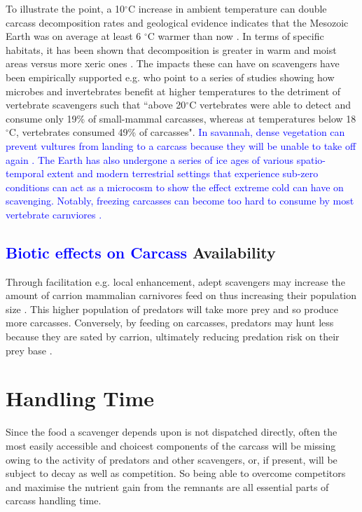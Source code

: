 \documentclass[a4paper,12pt]{article}
\begin{document}
To illustrate the point, a 10$^{\circ}$C increase in ambient temperature can double carcass decomposition rates \citep{parmenter2009carrion} and geological evidence indicates that the Mesozoic Earth was on average at least 6 $^{\circ}$C warmer than now \citep{sellwood2006mesozoic}.
In terms of specific habitats, it has been shown that decomposition is greater in warm and moist areas versus more xeric ones \citep{beasley2015vertebrates}.
The impacts these can have on scavengers have been empirically supported e.g. \cite{beasley2015vertebrates} who point to a series of studies showing how microbes and invertebrates benefit at higher temperatures to the detriment of vertebrate scavengers such that ``above 20$^{\circ}$C vertebrates were able to detect and consume only 19\% of small-mammal carcasses, whereas at temperatures below 18$^{\circ}$C, vertebrates consumed 49\% of carcasses".
\textcolor{blue}{In savannah, dense vegetation can prevent vultures from landing to a carcass because they will be unable to take off again \citep{bamford2009effect}. 
The Earth has also undergone a series of ice ages of various spatio-temporal extent \citep{diedrich2012cave} and modern terrestrial settings that experience sub-zero conditions can act as a microcosm to show the effect extreme cold can have on scavenging.
Notably, freezing carcasses can become too hard to consume by most vertebrate carnviores \citep{selva2003scavenging}.}

\subsection{\textcolor{blue}{Biotic effects on Carcass} Availability}
Through facilitation e.g. local enhancement, adept scavengers may increase the amount of carrion mammalian carnivores feed on thus increasing their population size \citep{moleon2014inter}. 
This higher population of predators will take more prey and so produce more carcasses. Conversely, by feeding on carcasses, predators may hunt less because they are sated by carrion, ultimately reducing predation risk on their prey base \citep{moleon2014inter}. 


\section{Handling Time}
\label{handlingTime}
Since the food a scavenger depends upon is not dispatched directly, often the most easily accessible and choicest components of the carcass will be missing owing to the activity of predators and other scavengers, or, if present, will be subject to decay as well as competition.
So being able to overcome competitors and maximise the nutrient gain from the remnants are all essential parts of carcass handling time. 
\end{document}
